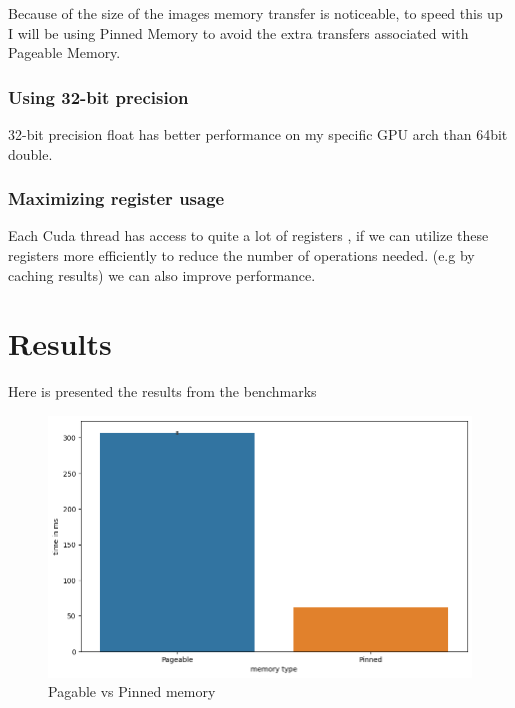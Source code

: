 \documentclass{article}
\begin{document}
Because of the size of the images memory transfer is noticeable, to speed this up I will be
using Pinned Memory \cite{pinned memory} to avoid the extra transfers associated with Pageable Memory.

\subsubsection{Using 32-bit precision}%
\label{ssub:pinned_memory}

32-bit precision float has better performance on my specific GPU arch than 64bit double.

\subsubsection{Maximizing register usage}%
\label{ssub:maximizing_register_usage}

Each Cuda thread has access to quite a lot of registers \cite{cuda-registers}, if we can
utilize these registers more efficiently to reduce the number of operations needed. (e.g by
caching results) we can also improve performance.


\section{Results}%
\label{sec:results}

Here is presented the results from the benchmarks

\begin{figure}[H]
  \centering
  \includegraphics[width=0.98\linewidth]{read.png}
  \caption{Pagable vs Pinned memory}
  \label{fig:memory}
\end{figure}
\end{document}
